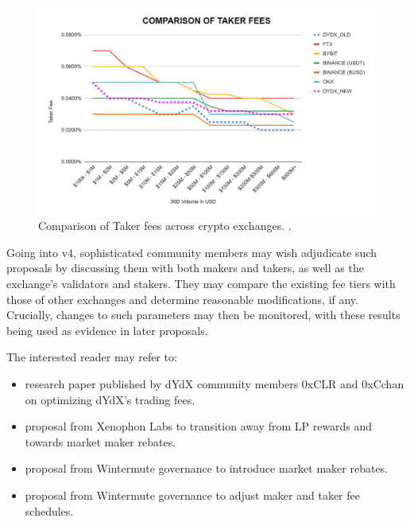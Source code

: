             \begin{figure}[htp]
                \centering
                \includegraphics[width=0.7\linewidth]{figs/fee_comp_takers.png}
                \caption{Comparison of Taker fees across crypto exchanges. .}
                \label{fig:fee_comp_takers}
            \end{figure}

            Going into v4, sophisticated community members may wish adjudicate such proposals by discussing them with both makers and takers, as well as the exchange's validators and stakers. They may compare the existing fee tiers with those of other exchanges and determine reasonable modifications, if any. Crucially, changes to such parameters may then be monitored, with these results being used as evidence in later proposals. 
            
            The interested reader may refer to:
            \begin{itemize}
                \item {} research paper published by dYdX community members 0xCLR and 0xCchan on optimizing dYdX's trading fees.
                \item {} proposal from Xenophon Labs to transition away from LP rewards and towards market maker rebates.
                \item {} proposal from Wintermute governance to introduce market maker rebates.
                \item {} proposal from Wintermute governance to adjust maker and taker fee schedules.
            \end{itemize}

